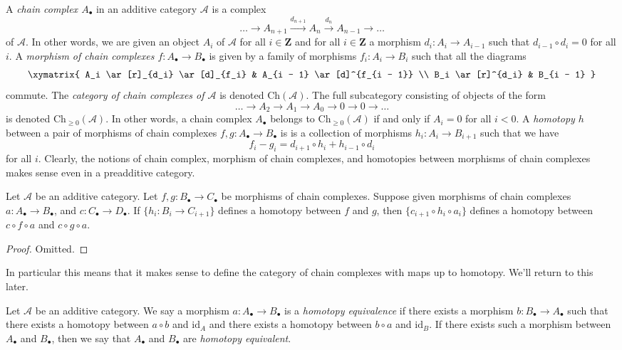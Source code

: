 \medskip\noindent
A {\it chain complex $A_\bullet$} in an additive category $\mathcal{A}$
is a complex
$$
\ldots \to
A_{n + 1} \xrightarrow{d_{n + 1}}
A_n \xrightarrow{d_n}
A_{n - 1} \to
\ldots
$$
of $\mathcal{A}$. In other words, we are given an object $A_i$ of
$\mathcal{A}$ for all $i \in \mathbf{Z}$ and for
all $i \in \mathbf{Z}$ a morphism $d_i : A_i \to A_{i - 1}$ such that
$d_{i - 1} \circ d_i = 0$ for all $i$. A {\it morphism of chain
complexes $f : A_\bullet \to B_\bullet$} is given by a
family of morphisms $f_i : A_i \to B_i$ such that all
the diagrams
$$
\xymatrix{
A_i \ar[r]_{d_i} \ar[d]_{f_i} & A_{i - 1} \ar[d]^{f_{i - 1}} \\
B_i \ar[r]^{d_i} & B_{i - 1}
}
$$
commute. The {\it category of chain complexes of $\mathcal{A}$}
is denoted $\text{Ch}(\mathcal{A})$. The full subcategory consisting
of objects of the form
$$
\ldots \to A_2 \to A_1 \to A_0 \to 0 \to 0 \to \ldots
$$
is denoted $\text{Ch}_{\geq 0}(\mathcal{A})$.
In other words, a chain complex $A_\bullet$ belongs to
$\text{Ch}_{\geq 0}(\mathcal{A})$ if and only if
$A_i = 0$ for all $i < 0$.
A {\it homotopy $h$} between a pair of morphisms
of chain complexes $f, g : A_\bullet \to B_\bullet$ is
is a collection of morphisms $h_i : A_i \to B_{i + 1}$
such that we have
$$
f_i - g_i = d_{i + 1} \circ h_i + h_{i - 1} \circ d_i
$$
for all $i$. Clearly, the notions of chain complex, morphism of
chain complexes, and homotopies between morphisms of chain complexes
makes sense even in a preadditive category.

\begin{lemma}
\label{lemma-compose-homotopy}
Let $\mathcal{A}$ be an additive category.
Let $f, g : B_\bullet \to C_\bullet$ be morphisms
of chain complexes. Suppose given morphisms of chain
complexes $a : A_\bullet \to B_\bullet$, and
$c : C_\bullet \to D_\bullet$.
If $\{h_i : B_i \to C_{i + 1}\}$ defines a homotopy
between $f$ and $g$, then $\{c_{i + 1} \circ h_i \circ a_i\}$
defines a homotopy between $c \circ f \circ a$ and
$c \circ g \circ a$.
\end{lemma}

\begin{proof}
Omitted.
\end{proof}

\noindent
In particular this means that it makes sense to define
the category of chain complexes with maps up to homotopy.
We'll return to this later.

\begin{definition}
\label{definition-homotopy-equivalent}
Let $\mathcal{A}$ be an additive category.
We say a morphism $a : A_\bullet \to B_\bullet$
is a {\it homotopy equivalence} if there exists
a morphism $b : B_\bullet \to A_\bullet$
such that there exists a homotopy between
$a \circ b$ and $\text{id}_A$
and there exists a homotopy between $b \circ a$ and $\text{id}_B$.
If there exists such a morphism between $A_\bullet$ and $B_\bullet$, then
we say that $A_\bullet$ and $B_\bullet$ are {\it homotopy equivalent}.
\end{definition}

